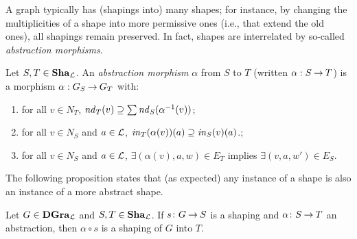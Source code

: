 A graph typically has (shapings into) many shapes; for instance, by changing the
multiplicities of a shape into more permissive ones (i.e., that extend the old
ones), all shapings remain preserved.  In fact, shapes are interrelated by
so-called \emph{abstraction morphisms}.
%
\begin{definition}
  Let $S,T \in \mathbf{Sha}_{\cal L}$. An {\em abstraction morphism} $\alpha$ from $S$ to
  $T$ (written $\alpha:S \mathbin{\rightarrow} T$) is a morphism $\alpha:G_S \mathbin{\rightarrow} G_T$ with:
  \begin{enumerate}\noitemsep\smalltopsep
  \item for all $v \in N_T$, $\mathit{nd}_T(v) \supseteq \sum
    \mathit{nd}_S(\alpha^{-1}(v))$;
  \item for all $v \in N_S$ and $a\in {\cal L}$, $\mathit{in}_T(\alpha(v))(a) \supseteq
    \mathit{in}_S(v)(a)$.;
  \item for all $v \in N_S$ and $a\in {\cal L}$, $\exists(\alpha(v),a,w)\in E_T$
    implies $\exists(v,a,w')\in E_S$.
  \end{enumerate}
\end{definition}
%
The following proposition states that (as expected) any instance of a shape is
also an instance of a more abstract shape.
%
\begin{proposition}
  Let $G\in \mathbf{DGra}_{\cal L}$ and $S,T\in \mathbf{Sha}_{\cal L}$. If $s\colon {G} \mathbin{\rightarrow} {S}$ is a shaping
  and $\alpha\colon {S} \mathbin{\rightarrow} {T}$ an abstraction, then $\alpha\circ s$ is a shaping
  of $G$ into $T$.
\end{proposition}




